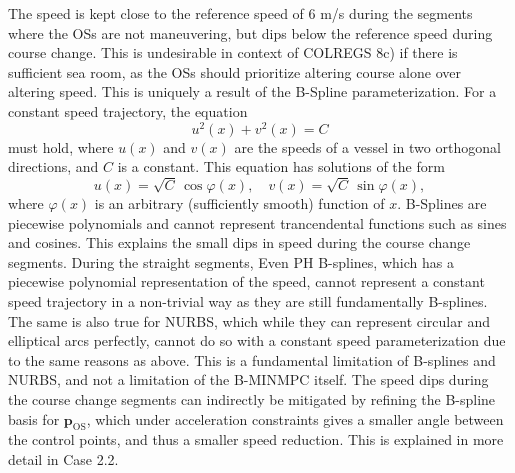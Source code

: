 The speed is kept close to the reference speed of 6 m/s during the segments where the OSs are not maneuvering, but dips below the reference speed during course change.  This is undesirable in context of COLREGS 8c) if there is sufficient sea room, as the OSs should prioritize altering course alone over altering speed.  This is uniquely a result of the B-Spline parameterization. For a constant speed trajectory, the equation
\begin{equation}
    u^2(x) + v^2(x) = C
\end{equation}
must hold, where $u(x)$ and $v(x)$ are the speeds of a vessel in two orthogonal directions, and $C$ is a constant. This equation has solutions of the form
\begin{equation}
  u(x) = \sqrt{C}\,\cos\varphi(x), 
  \quad
  v(x) = \sqrt{C}\,\sin\varphi(x),
\end{equation}
where $\varphi(x)$ is an arbitrary (sufficiently smooth) function of $x$.  B-Splines are piecewise polynomials and cannot represent trancendental functions such as sines and cosines.  This explains the small dips in speed during the course change segments. During the straight segments,  
Even PH B-splines, which has a piecewise polynomial representation of the speed, cannot represent a constant speed trajectory in a non-trivial way as they are still fundamentally B-splines.  The same is also true for NURBS, which while they can represent circular and elliptical arcs perfectly, cannot do so with a constant speed parameterization due to the same reasons as above.  This is a fundamental limitation of B-splines and NURBS, and not a limitation of the B-MINMPC itself.  The speed dips during the course change segments can indirectly be mitigated by refining the B-spline basis for $\mathbf p_\text{OS}$, which under acceleration constraints gives a smaller angle between the control points, and thus a smaller speed reduction. This is explained in more detail in Case 2.2.




